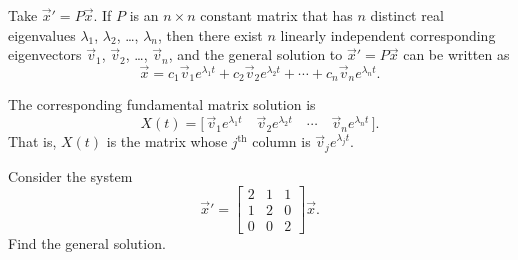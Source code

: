 \documentclass{ximera}
\begin{document}
\begin{theorem}{}
    Take ${\vec{x}}' = P\vec{x}$.  If $P$ is an $n \times n$ constant matrix that has $n$ distinct real eigenvalues $\lambda_1$, $\lambda_2$, \ldots, $\lambda_n$, then there exist $n$ linearly independent corresponding eigenvectors $\vec{v}_1$, $\vec{v}_2$, \ldots, $\vec{v}_n$, and the general solution to ${\vec{x}}' = P\vec{x}$ can be written as
    \begin{equation*}
        \vec{x} = c_1 \vec{v}_1 e^{\lambda_1 t} + c_2 \vec{v}_2 e^{\lambda_2 t} + \cdots + c_n \vec{v}_n e^{\lambda_n t} .
    \end{equation*}
\end{theorem}

The corresponding fundamental matrix solution is
\begin{equation*}
    X(t) = \bigl[\, \vec{v}_1 e^{\lambda_1 t} \quad \vec{v}_2 e^{\lambda_2 t} \quad \cdots \quad \vec{v}_n e^{\lambda_n t} \,\bigr].
\end{equation*}
That is, $X(t)$ is the matrix whose $j^{\text{th}}$ column is  $\vec{v}_j e^{\lambda_j t}$.

\begin{example}
    Consider the system
    \begin{equation*}
        {\vec{x}}' =
        \begin{bmatrix}
            2 & 1 & 1 \\
            1 & 2 & 0 \\
            0 & 0 & 2
        \end{bmatrix}
        \vec{x} .
    \end{equation*}
    Find the general solution.
\end{example}
\end{document}
